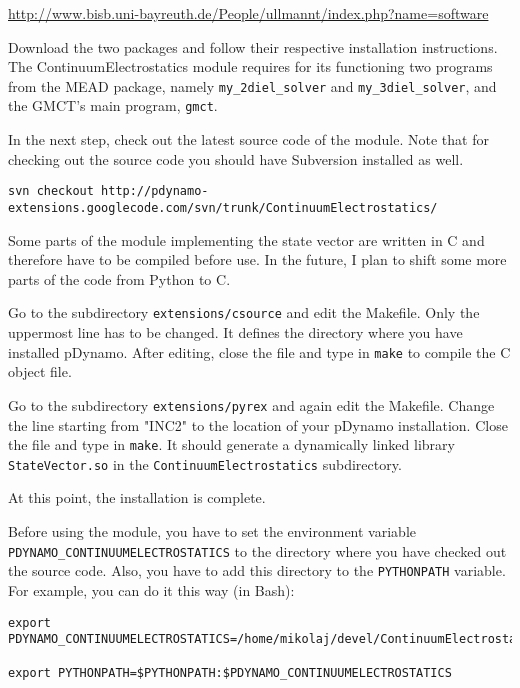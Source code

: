 \documentclass[a4paper,11pt]{article}
\newcommand{\modulename}{ContinuumElectrostatics\xspace}
\begin{document}
\url{http://www.bisb.uni-bayreuth.de/People/ullmannt/index.php?name=software}

Download the two packages and follow their respective installation 
instructions.
%
The \modulename module requires for its functioning two programs 
from the MEAD package, namely \texttt{my\_2diel\_solver} and \texttt{my\_3diel\_solver}, 
and the GMCT's main program, \texttt{gmct}.

\bigskip
In the next step, check out the latest source code of the module.
%
Note that for checking out the source code you should have Subversion installed 
as well.

{\footnotesize \begin{lstlisting}
svn checkout http://pdynamo-extensions.googlecode.com/svn/trunk/ContinuumElectrostatics/
\end{lstlisting} }

\bigskip
Some parts of the module implementing the state vector are written in C and
therefore have to be compiled before use. In the future, I plan to shift some 
more parts of the code from Python to C.

\bigskip
Go to the subdirectory \texttt{extensions/csource} and edit the Makefile. Only the
uppermost line has to be changed. It defines the directory where you have
installed pDynamo. After editing, close the file and type in \texttt{make} to compile
the C object file.

\bigskip
Go to the subdirectory \texttt{extensions/pyrex} and again edit the Makefile. Change
the line starting from "INC2" to the location of your pDynamo installation.
Close the file and type in \texttt{make}. It should generate a dynamically linked 
library \texttt{StateVector.so} in the \texttt{ContinuumElectrostatics} subdirectory.

\bigskip
At this point, the installation is complete.

\bigskip
Before using the module, you have to set the environment variable\\
\texttt{PDYNAMO\_CONTINUUMELECTROSTATICS} to the directory where you have checked out 
the source code. Also, you have to add this directory to the \texttt{PYTHONPATH}
variable. For example, you can do it this way (in Bash):

\newpage
{\footnotesize \begin{lstlisting}
export PDYNAMO_CONTINUUMELECTROSTATICS=/home/mikolaj/devel/ContinuumElectrostatics

export PYTHONPATH=$PYTHONPATH:$PDYNAMO_CONTINUUMELECTROSTATICS
\end{lstlisting} }
\end{document}
